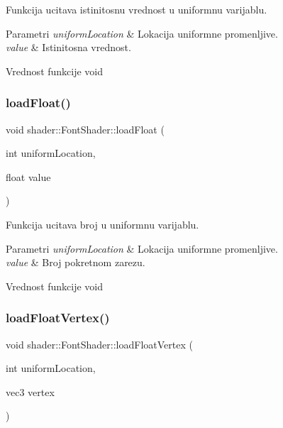 Funkcija ucitava istinitosnu vrednost u uniformnu varijablu. 


\begin{DoxyParams}{Parametri}
{\em uniform\+Location} & Lokacija uniformne promenljive. \\
\hline
{\em value} & Istinitosna vrednost. \\
\hline
\end{DoxyParams}
\begin{DoxyReturn}{Vrednost funkcije}
void 
\end{DoxyReturn}
\mbox{\label{classshader_1_1FontShader_a34039484ee1b1f2b4799aa08d81da019}} 
\subsubsection{\texorpdfstring{load\+Float()}{loadFloat()}}
{\footnotesize\ttfamily void shader\+::\+Font\+Shader\+::load\+Float (\begin{DoxyParamCaption}\item[{int}]{uniform\+Location,  }\item[{float}]{value }\end{DoxyParamCaption})}



Funkcija ucitava broj u uniformnu varijablu. 


\begin{DoxyParams}{Parametri}
{\em uniform\+Location} & Lokacija uniformne promenljive. \\
\hline
{\em value} & Broj pokretnom zarezu. \\
\hline
\end{DoxyParams}
\begin{DoxyReturn}{Vrednost funkcije}
void 
\end{DoxyReturn}
\mbox{\label{classshader_1_1FontShader_a18c2405ae1e1bdf5ff417d5bba7febdf}} 
\subsubsection{\texorpdfstring{load\+Float\+Vertex()}{loadFloatVertex()}}
{\footnotesize\ttfamily void shader\+::\+Font\+Shader\+::load\+Float\+Vertex (\begin{DoxyParamCaption}\item[{int}]{uniform\+Location,  }\item[{vec3}]{vertex }\end{DoxyParamCaption})}




